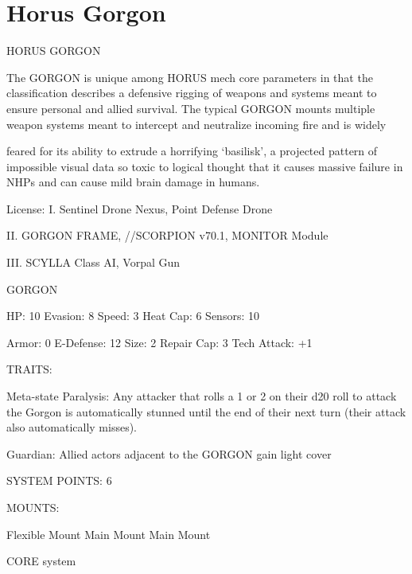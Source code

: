 \section{Horus Gorgon}


                                              HORUS GORGON

The GORGON is unique among HORUS mech core parameters in that the classification describes a
defensive rigging of weapons and systems meant to ensure personal and allied survival. The typical
GORGON mounts multiple weapon systems meant to intercept and neutralize incoming fire and is widely

feared for its ability to extrude a horrifying ‘basilisk’, a projected pattern of impossible visual data so toxic to
logical thought that it causes massive failure in NHPs and can cause mild brain damage in humans.




                                                   License:
I. Sentinel Drone Nexus, Point Defense Drone

II. GORGON FRAME,  //SCORPION v70.1, MONITOR Module

III. SCYLLA Class AI, Vorpal Gun


                                                 GORGON

 HP: 10         Evasion: 8                            Speed: 3            Heat Cap: 6        Sensors: 10

 Armor: 0       E-Defense: 12                         Size: 2             Repair Cap: 3      Tech Attack:
                                                                                             +1

                                                   TRAITS:

 Meta-state Paralysis: Any attacker that rolls a 1 or 2 on their d20 roll to attack the Gorgon is
 automatically stunned until the end of their next turn (their attack also automatically misses).

 Guardian: Allied actors adjacent to the GORGON gain light cover

                                             SYSTEM POINTS: 6

                                                  MOUNTS:

 Flexible Mount                    Main Mount                             Main Mount

                                                CORE system


